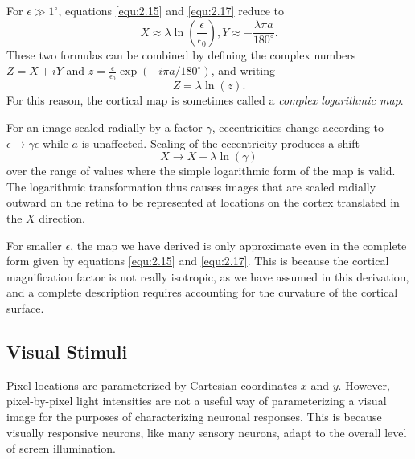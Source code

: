 \begin{exm}
  For $\epsilon \gg 1^{\circ}$, equations \ref{equ:2.15} and \ref{equ:2.17} reduce to
  \begin{displaymath}
    X \approx \lambda\ln(\frac{\epsilon}{\epsilon_0}),
    Y \approx -\frac{\lambda \pi a}{180^{\circ}}.
  \end{displaymath}
  These two formulas can be combined by defining the complex numbers
  $Z = X+iY$ and $z = \frac{\epsilon}{\epsilon_0}\exp\left(-i\pi a/180^{\circ}\right)$, and writing
  \begin{displaymath}
    Z = \lambda\ln(z).
  \end{displaymath}
  For this reason, the cortical map is sometimes called a \emph{complex logarithmic map}.

  For an image scaled radially by a factor $\gamma$, eccentricities change according to $\epsilon \to \gamma \epsilon$ while $a$ is unaffected. Scaling of the eccentricity produces a shift
  \begin{displaymath}
    X \to X+\lambda\ln(\gamma)
  \end{displaymath}
  over the range of values where the simple logarithmic form of the map is valid. The logarithmic transformation thus causes images that are scaled radially outward on the retina to be represented at locations on the cortex translated in the $X$ direction.
\end{exm}

\begin{rem}
  For smaller $\epsilon$, the map we have derived is only approximate even in the complete form given by equations \ref{equ:2.15} and \ref{equ:2.17}. This is because the cortical magnification factor is not really isotropic, as we have assumed in this derivation, and a complete description requires accounting for the curvature of the cortical surface.
\end{rem}

\subsection{Visual Stimuli}
\label{sec:visualStimuli}
\begin{rem}
  Pixel locations are parameterized by Cartesian coordinates $x$ and $y$. However, pixel-by-pixel light intensities are not a useful way of parameterizing a visual image for the purposes of characterizing neuronal responses. This is because visually responsive neurons, like many sensory neurons, adapt to the overall level of screen illumination.
\end{rem}

